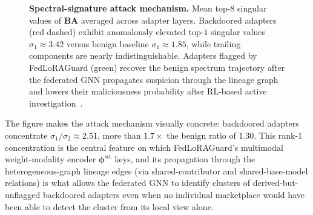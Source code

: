 \documentclass[12pt,a4paper]{article}
\theoremstyle{definition}
\theoremstyle{remark}
\newcommand{\modelname}{FedLoRAGuard}
\begin{document}
\begin{figure}[!t]
\centering
{}
\caption{\textbf{Spectral-signature attack mechanism.} Mean top-$8$ singular values of $\mathbf{B}\mathbf{A}$ averaged across adapter layers. Backdoored adapters (red dashed) exhibit anomalously elevated top-$1$ singular values $\sigma_1 \approx 3.42$ versus benign baseline $\sigma_1 \approx 1.85$, while trailing components are nearly indistinguishable. Adapters flagged by \modelname{} (green) recover the benign spectrum trajectory after the federated GNN propagates suspicion through the lineage graph and lowers their maliciousness probability after RL-based active investigation~\cite{anaedevha2025dqn}.}
\label{fig:spectrum}
\end{figure}

The figure makes the attack mechanism visually concrete: backdoored adapters concentrate $\sigma_1 / \sigma_2 \approx 2.51$, more than $1.7\times$ the benign ratio of $1.30$. This rank-1 concentration is the central feature on which \modelname{}'s multimodal weight-modality encoder $\bm{\phi}^{\mathrm{wt}}$ keys, and its propagation through the heterogeneous-graph lineage edges (via shared-contributor and shared-base-model relations) is what allows the federated GNN to identify clusters of derived-but-unflagged backdoored adapters even when no individual marketplace would have been able to detect the cluster from its local view alone.
\end{document}
